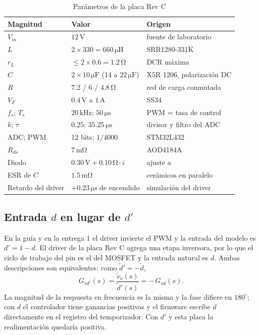 \documentclass[conference,letterpaper]{IEEEtran}
\newcommand{\unit}[1]{\,\mathrm{#1}}
\begin{document}
\begin{table}[H]\caption{Parámetros de la placa Rev C}\label{tab:param}\centering\footnotesize\setlength{\tabcolsep}{2pt}\renewcommand{\arraystretch}{1.15}\begin{tabularx}{\columnwidth}{lYl}\toprule
Magnitud & Valor & Origen\\\midrule
$V_{in}$ & $12\unit{V}$ & fuente de laboratorio\\
$L$ & $2\times330=660\unit{\mu H}$ & SRR1280-331K \cite{srr}\\
$r_L$ & $\le 2\times0.6=1.2\unit{\Omega}$ & DCR máxima \cite{srr}\\
$C$ & $2\times10\unit{\mu F}$ (14 a $22\unit{\mu F}$) & X5R 1206, polarización DC\\
$R$ & $7.2$ / $6$ / $4.8\unit{\Omega}$ & red de carga conmutada\\
$V_F$ & $0.4\unit{V}$ a $1\unit{A}$ & SS34 \cite{ss34}\\
$f_s$; $T_s$ & $20\unit{kHz}$; $50\unit{\mu s}$ & PWM = tasa de control\\
$k$; $\tau$ & $0.25$; $35.25\unit{\mu s}$ & divisor y filtro del ADC\\
ADC; PWM & 12 bits; $1/4000$ & STM32L432 \cite{rm0394}\\\midrule
$R_{ds}$ & $7\unit{m\Omega}$ & AOD4184A \cite{aod}\\
Diodo & $0.30\unit{V}+0.10\unit{\Omega}\cdot i$ & ajuste a \cite{ss34}\\
ESR de $C$ & $1.5\unit{m\Omega}$ & cerámicos en paralelo\\
Retardo del driver & $+0.23\unit{\mu s}$ de encendido & simulación del driver\\\bottomrule\end{tabularx}\end{table}

\subsection{Entrada $d$ en lugar de $d'$}
En la guía y en la entrega 1 \cite{e1} el driver invierte el PWM y la entrada del modelo es $d'=1-d$. El driver de la placa Rev C agrega una etapa inversora, por lo que el ciclo de trabajo del pin es el del MOSFET y la entrada natural es $d$. Ambas descripciones son equivalentes: como $\tilde d'=-\tilde d$,
\begin{equation}
G_{vd'}(s)=\frac{\tilde v_o(s)}{\tilde d'(s)}=-\,G_{vd}(s).\label{eq:dprima}
\end{equation}
La magnitud de la respuesta en frecuencia es la misma y la fase difiere en $180^\circ$; con $d$ el controlador tiene ganancias positivas y el firmware escribe $d$ directamente en el registro del temporizador. Con $d'$ y esta placa la realimentación quedaría positiva.
\end{document}
